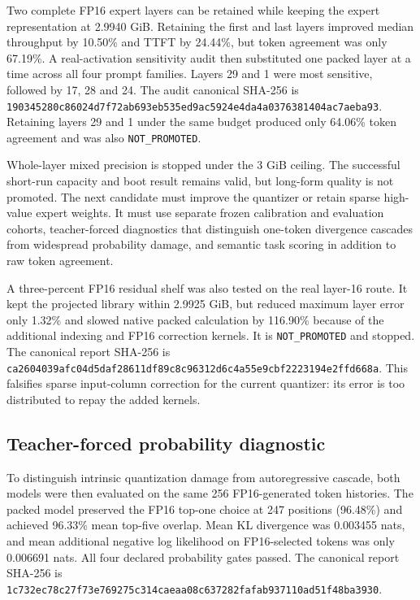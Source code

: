 Two complete FP16 expert layers can be retained while keeping the expert
representation at 2.9940 GiB. Retaining the first and last layers improved
median throughput by 10.50\% and TTFT by 24.44\%, but token agreement was only
67.19\%. A real-activation sensitivity audit then substituted one packed layer
at a time across all four prompt families. Layers 29 and 1 were most sensitive,
followed by 17, 28 and 24. The audit canonical SHA-256 is
\texttt{190345280c86024d7f72ab693eb535ed9ac5924e4da4a0376381404ac7aeba93}.
Retaining layers 29 and 1 under the same budget produced only 64.06\% token
agreement and was also \texttt{NOT\_PROMOTED}.

Whole-layer mixed precision is stopped under the 3 GiB ceiling. The successful
short-run capacity and boot result remains valid, but long-form quality is not
promoted. The next candidate must improve the quantizer or retain sparse
high-value expert weights. It must use separate frozen calibration and
evaluation cohorts, teacher-forced diagnostics that distinguish one-token
divergence cascades from widespread probability damage, and semantic task
scoring in addition to raw token agreement.

A three-percent FP16 residual shelf was also tested on the real layer-16 route.
It kept the projected library within 2.9925 GiB, but reduced maximum layer error
only 1.32\% and slowed native packed calculation by 116.90\% because of the
additional indexing and FP16 correction kernels. It is
\texttt{NOT\_PROMOTED} and stopped. The canonical report SHA-256 is
\texttt{ca2604039afc04d5daf28611df89c8c96312d6c4a55e9cbf2223194e2ffd668a}.
This falsifies sparse input-column correction for the current quantizer: its
error is too distributed to repay the added kernels.

\subsection{Teacher-forced probability diagnostic}

To distinguish intrinsic quantization damage from autoregressive cascade, both
models were then evaluated on the same 256 FP16-generated token histories. The
packed model preserved the FP16 top-one choice at 247 positions (96.48\%) and
achieved 96.33\% mean top-five overlap. Mean KL divergence was 0.003455 nats,
and mean additional negative log likelihood on FP16-selected tokens was only
0.006691 nats. All four declared probability gates passed. The canonical report
SHA-256 is
\texttt{1c732ec78c27f73e769275c314caeaa08c637282fafab937110ad51f48ba3930}.

